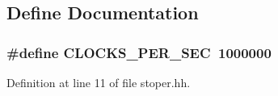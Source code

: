 \subsection{\-Define \-Documentation}
\hypertarget{stoper_8hh_a3d9fc3c745d0880902fe3ea3d5d5f71e}{
\subsubsection[{\-C\-L\-O\-C\-K\-S\-\_\-\-P\-E\-R\-\_\-\-S\-E\-C}]{\setlength{\rightskip}{0pt plus 5cm}\#define {\bf \-C\-L\-O\-C\-K\-S\-\_\-\-P\-E\-R\-\_\-\-S\-E\-C}~1000000}}\label{stoper_8hh_a3d9fc3c745d0880902fe3ea3d5d5f71e}


\-Definition at line 11 of file stoper.\-hh.

